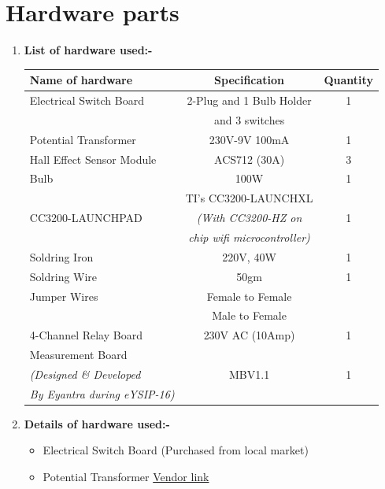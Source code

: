 \documentclass[a4paper,12pt,oneside]{book}
\begin{document}
\newpage
\section{Hardware parts}
\begin{enumerate}
  \item \textbf{List of hardware used:-}\\
  
		 \begin{tabular}{|l|c|c|}
		 	\hline
		 	\textbf{Name of hardware} & \textbf{Specification} & \textbf{Quantity} \\ \hline
		 	Electrical Switch Board& 2-Plug and 1 Bulb Holder & 1\\ 
		 	& and 3 switches&\\\hline
		 	Potential Transformer& 230V-9V 100mA &1 \\ \hline
		 	Hall Effect Sensor Module& ACS712 (30A) &3\\ \hline
		 	Bulb& 100W & 1\\ \hline
		 	& TI's CC3200-LAUNCHXL&\\
		 	CC3200-LAUNCHPAD&\textit{(With CC3200-HZ on } &1 \\
		 	&\textit{ chip wifi microcontroller)} &\\\hline
		 	Soldring Iron& 220V, 40W &1 \\ \hline
		 	Soldring Wire& 50gm & 1 \\ \hline
		 	Jumper Wires& Female to Female & \\\cline{2-3}
		 	&Male to Female& \\\hline
		 	4-Channel Relay Board& 230V AC (10Amp)& 1\\ \hline
		 	Measurement Board& & \\ 
		 	\textit{(Designed \& Developed } & MBV1.1 & 1 \\
		 	\textit{ \hspace{1cm}By Eyantra during eYSIP-16) } & & \\ \hline
		 \end{tabular}
		 \vspace{1cm}
	\item \textbf{Details of hardware used:-}
	\begin{itemize}
		  \item Electrical Switch Board (Purchased from local market) 
		  \item Potential Transformer \href{http://www.amazon.in/Input-Output-EI-41x20-5-Power-Transformer/dp/B01I1ZMGKW/ref=sr_1_5?ie=UTF8&qid=1469263889&sr=8-5&keywords=9v+transformer}{Vendor link}

\end{itemize}
\end{enumerate}
\end{document}
